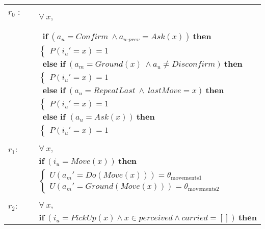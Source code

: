 \begin{footnotesize}
\begin{longtable}{p{1cm}p{14cm}}
$r_0$ : \ \ & $\forall \ x, $ \\ &  $ \ \ \textbf{if} \ (\mathit{a_u}\!=\!\mathit{Confirm} \ \land \mathit{a_{u\mbox{-}prev}}\!=\!\mathit{Ask}(x)) \ \textbf{then} $ \\
& \;\;\;\;\; $ \begin{cases}P(\mathit{i_u}'\!=\!x)\!=\!1\end{cases}$  \vspace{1mm}  \\
&  $ \ \ \textbf{else if} \ (\mathit{a_m}\!=\!\mathit{Ground}(x) \ \land \mathit{a_{u}}\!\neq\!\mathit{Disconfirm}) \ \textbf{then} $ \\
& \;\;\;\;\; $ \begin{cases}P(\mathit{i_u}'\!=\!x)\!=\!1\end{cases}$  \vspace{1mm}  \\
 &$ \ \ \textbf{else if} \ (\mathit{a_u}\!=\!\mathit{RepeatLast} \ \land \ \mathit{lastMove}\!=\!x) \ \textbf{then}$ \\
& \;\;\;\;\; $ \begin{cases}P(\mathit{i_u}'\!=\!x)\!=\!1\end{cases}$  \vspace{1mm}  \\
& $ \ \ \textbf{else if } (\mathit{a_u}\!=\!\mathit{Ask}(x)) \ \textbf{then} $ \\
& \;\;\;\;\; $ \begin{cases}P(\mathit{i_u}'\!=\!x)\!=\!1\end{cases}$ \\ \\[-1mm]
$r_{1}$: \ \ & $\forall \ x, $ \\ & $ \textbf{if} \ (\mathit{i_u}\!=\!\mathit{Move(x)}) \ \textbf{then} $ \\
 & \;\;\;\;\; $ \begin{cases}U(\mathit{a_m}'\!=\!\mathit{Do(Move({x}))})\!=\!\theta_{\mathrm{movements1}} \\
U(\mathit{a_m}'\!=\!\mathit{Ground(Move({x}))})\!=\!\theta_{\mathrm{movements2}} \end{cases}$  \\ \\[-1mm]
$r_{2}$: \ \ & $\forall \ x,$ \\ &  $\textbf{if} \ (\mathit{i_u}\!=\!\mathit{PickUp({x})} \land \mathit{{x}}\!\in\!\mathit{perceived} \land \mathit{carried}\!=\!\mathit{[]}) \ \textbf{then} $ \\

\end{longtable}
\end{footnotesize}
